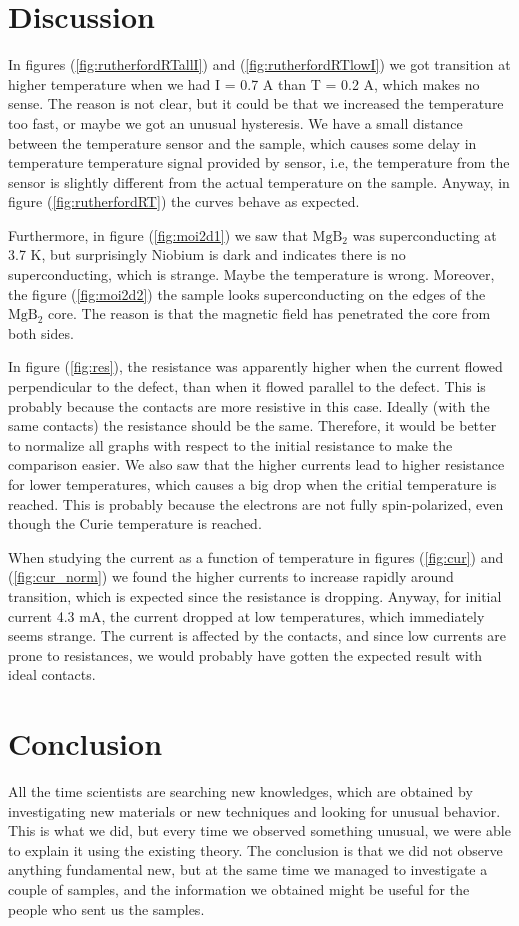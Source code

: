 \documentclass{comjnl}
\newcommand*\chem[1]{\ensuremath{\mathrm{#1}}}
\begin{document}
\section{Discussion} \label{Sec:Discussion}
In figures (\ref{fig:rutherfordRTallI}) and (\ref{fig:rutherfordRTlowI}) we got transition at higher temperature when we had I = 0.7 A than T = 0.2 A, which makes no sense. The reason is not clear, but it could be that we increased the temperature too fast, or maybe we got an unusual hysteresis. We have a small distance between the temperature sensor and the sample, which causes some delay in temperature temperature signal provided by sensor, i.e, the temperature from the sensor is slightly different from the actual temperature on the sample. Anyway, in figure (\ref{fig:rutherfordRT}) the curves behave as expected. 

Furthermore, in figure (\ref{fig:moi2d1}) we saw that \chem{MgB_2} was superconducting at 3.7 K, but surprisingly Niobium is dark and indicates there is no superconducting, which is strange. Maybe the temperature is wrong. Moreover, the figure (\ref{fig:moi2d2}) the sample looks superconducting on the edges of the \chem{MgB_2} core. The reason is that the magnetic field has penetrated the core from both sides. 

In figure (\ref{fig:res}), the resistance was apparently higher when the current flowed perpendicular to the defect, than when it flowed parallel to the defect. This is probably because the contacts are more resistive in this case. Ideally (with the same contacts) the resistance should be the same. Therefore, it would be better to normalize all graphs with respect to the initial resistance to make the comparison easier. We also saw that the higher currents lead to higher resistance for lower temperatures, which causes a big drop when the critial temperature is reached. This is probably because the electrons are not fully spin-polarized, even though the Curie temperature is reached. 

When studying the current as a function of temperature in figures (\ref{fig:cur}) and (\ref{fig:cur_norm}) we found the higher currents to increase rapidly around transition, which is expected since the resistance is dropping. Anyway, for initial current 4.3 mA, the current dropped at low temperatures, which immediately seems strange. The current is affected by the contacts, and since low currents are prone to resistances, we would probably have gotten the expected result with ideal contacts. 

\section{Conclusion} \label{Sec:Conclusion}
All the time scientists are searching new knowledges, which are obtained by investigating new materials or new techniques and looking for unusual behavior. This is what we did, but every time we observed something unusual, we were able to explain it using the existing theory. The conclusion is that we did not observe anything fundamental new, but at the same time we managed to investigate a couple of samples, and the information we obtained might be useful for the people who sent us the samples. 
\end{document}
